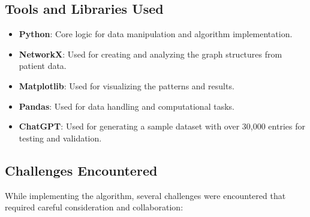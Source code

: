 \documentclass[11pt]{article}
\begin{document}
\subsection{Tools and Libraries Used}
\begin{itemize}
    \item \textbf{Python}: Core logic for data manipulation and algorithm implementation.
    \item \textbf{NetworkX}: Used for creating and analyzing the graph structures from patient data.
    \item \textbf{Matplotlib}: Used for visualizing the patterns and results.
    \item \textbf{Pandas}: Used for data handling and computational tasks.
    \item \textbf{ChatGPT}: Used for generating a sample dataset with over 30,000 entries for testing and validation.
\end{itemize}

\subsection{Challenges Encountered}

While implementing the algorithm, several challenges were encountered that required careful consideration and collaboration:
\end{document}
